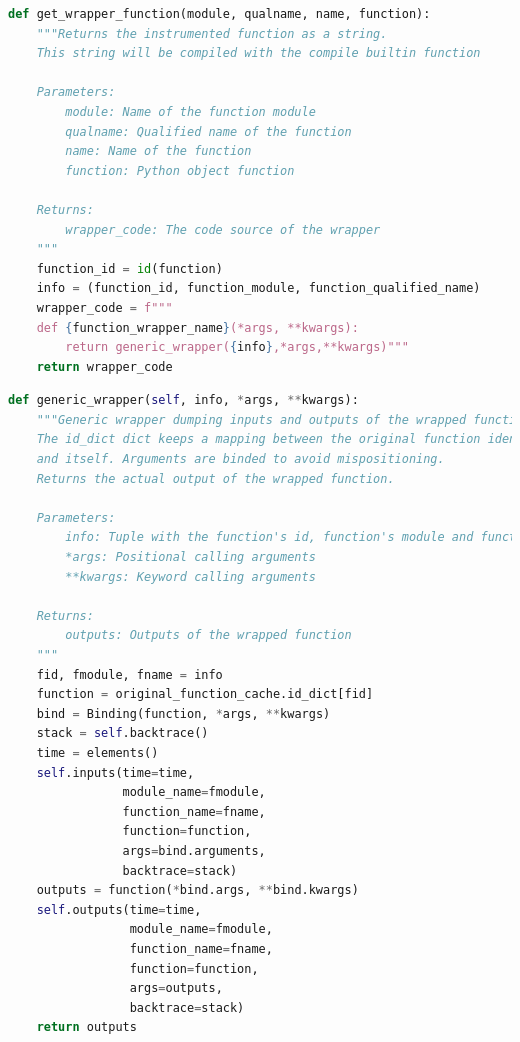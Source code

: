 \documentclass[11pt]{article}
\newcommand{\tristan}[1]{\color{orange}\textbf{From Tristan:} #1\color{black}\xspace}
\newcommand{\pytracer}[0]{PyTracer\xspace}
\begin{document}
\begin{listing}
    \centering
\begin{lstlisting}[language=Python,style=customPython]
def get_wrapper_function(module, qualname, name, function):
    """Returns the instrumented function as a string.
    This string will be compiled with the compile builtin function
    
    Parameters:
        module: Name of the function module
        qualname: Qualified name of the function
        name: Name of the function
        function: Python object function
        
    Returns:
        wrapper_code: The code source of the wrapper
    """
    function_id = id(function)
    info = (function_id, function_module, function_qualified_name)
    wrapper_code = f"""
    def {function_wrapper_name}(*args, **kwargs):
        return generic_wrapper({info},*args,**kwargs)"""
    return wrapper_code
\end{lstlisting}
    \caption{Function to create the instrumented version of a function.
    \pytracer uses the identifier of the function instead of the 
    actual function to handle aliases and avoid duplicate instrumentation.}
    \label{fig:wrapper_creation}
\end{listing}


\begin{listing}
    \centering
\begin{lstlisting}[language=Python,style=customPython,]
def generic_wrapper(self, info, *args, **kwargs):
    """Generic wrapper dumping inputs and outputs of the wrapped function.
    The id_dict dict keeps a mapping between the original function identifier
    and itself. Arguments are binded to avoid mispositioning.
    Returns the actual output of the wrapped function.
    
    Parameters:
        info: Tuple with the function's id, function's module and function's name
        *args: Positional calling arguments
        **kwargs: Keyword calling arguments
    
    Returns:
        outputs: Outputs of the wrapped function
    """
    fid, fmodule, fname = info
    function = original_function_cache.id_dict[fid]
    bind = Binding(function, *args, **kwargs)
    stack = self.backtrace()
    time = elements()
    self.inputs(time=time,
                module_name=fmodule,
                function_name=fname,
                function=function,
                args=bind.arguments,
                backtrace=stack)
    outputs = function(*bind.args, **bind.kwargs)
    self.outputs(time=time,
                 module_name=fmodule,
                 function_name=fname,
                 function=function,
                 args=outputs,
                 backtrace=stack)
    return outputs
\end{lstlisting}
    \caption{\pytracer's generic wrapper function that dumps
    the inputs and outputs of the wrapped function.
    \pytracer binds arguments to the function signature to avoid
    mispositioning \tristan{what does mispositioning means here?} and to show readable names in the visualization.
    }
    \label{fig:generic_wrapper}
\end{listing}
\end{document}
